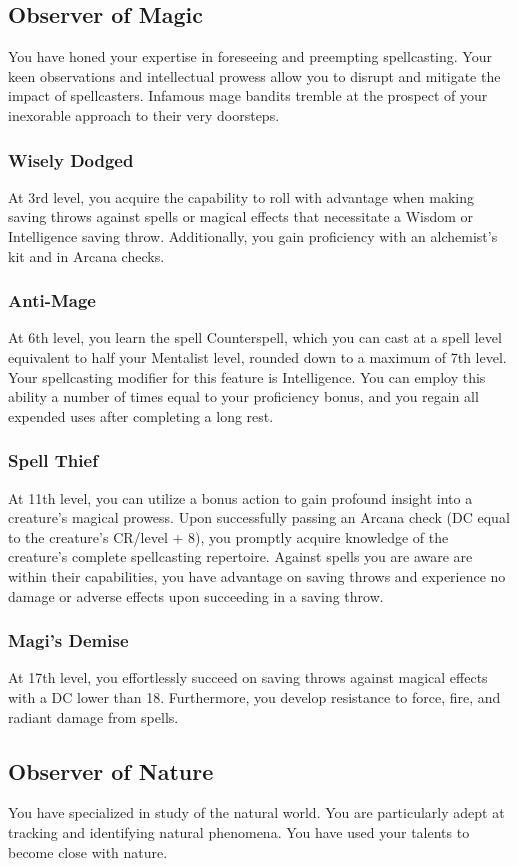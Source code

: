 \subsection{Observer of Magic}
You have honed your expertise in foreseeing and preempting spellcasting. Your keen observations and intellectual prowess allow you to disrupt and mitigate the impact of spellcasters. Infamous mage bandits tremble at the prospect of your inexorable approach to their very doorsteps.
\subsubsection{Wisely Dodged}
At 3rd level, you acquire the capability to roll with advantage when making saving throws against spells or magical effects that necessitate a Wisdom or Intelligence saving throw. Additionally, you gain proficiency with an alchemist’s kit and in Arcana checks.
\subsubsection{Anti-Mage}
At 6th level, you learn the spell Counterspell, which you can cast at a spell level equivalent to half your Mentalist level, rounded down to a maximum of 7th level. Your spellcasting modifier for this feature is Intelligence. You can employ this ability a number of times equal to your proficiency bonus, and you regain all expended uses after completing a long rest.
\subsubsection{Spell Thief}
At 11th level, you can utilize a bonus action to gain profound insight into a creature’s magical prowess. Upon successfully passing an Arcana check (DC equal to the creature's CR/level + 8), you promptly acquire knowledge of the creature’s complete spellcasting repertoire. Against spells you are aware are within their capabilities, you have advantage on saving throws and experience no damage or adverse effects upon succeeding in a saving throw.
\subsubsection{Magi's Demise}
At 17th level, you effortlessly succeed on saving throws against magical effects with a DC lower than 18. Furthermore, you develop resistance to force, fire, and radiant damage from spells.
\subsection{Observer of Nature}
You have specialized in study of the natural world. You are particularly adept at tracking and identifying natural phenomena. You have used your talents to become close with nature.
